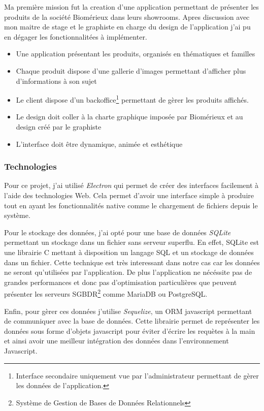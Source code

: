 \documentclass{article}
\begin{document}
Ma première mission fut la creation d'une application permettant de présenter les produits de la société Biomérieux dans leurs showrooms.
Apres discussion avec mon maitre de stage et le graphiste en charge du design de l'application j'ai pu en dégager les fonctionnalitées à implémenter.

\medskip

\begin{itemize}
    \item Une application présentant les produits, organisés en thématiques et familles
    \item Chaque produit dispose d'une gallerie d'images permettant d'afficher plus d'informations à son sujet
    \item Le client dispose d'un backoffice\footnote{Interface secondaire uniquement vue par l'administrateur permettant de gèrer les données de l'application.} permettant de gèrer les produits affichés.
    \item Le design doit coller à la charte graphique imposée par Biomérieux et au design créé par le graphiste
    \item L'interface doit être dynamique, animée et esthétique
\end{itemize}

\subsubsection{Technologies}

Pour ce projet, j'ai utilisé \emph{Electron} qui permet de créer des interfaces facilement à l'aide des technologies Web.
Cela permet d'avoir une interface simple à produire tout en ayant les fonctionnalités native comme le chargement de fichiers depuis le système.

Pour le stockage des données, j'ai opté pour une base de données \emph{SQLite} permettant un stockage dans un fichier sans serveur superflu.
En effet, SQLite est une librairie C mettant à disposition un langage SQL et un stockage de données dans un fichier.
Cette technique est très interessant dans notre cas car les données ne seront qu'utilisées par l'application.
De plus l'application ne nécéssite pas de grandes performances et donc pas d'optimisation particulières que peuvent présenter les serveurs SGBDR\footnote{Système de Gestion de Bases de Données Relationnels} comme MariaDB ou PostgreSQL\@.

Enfin, pour gèrer ces données j'utilise \emph{Sequelize}, un ORM javascript permettant de communiquer avec la base de données.
Cette librairie permet de représenter les données sous forme d'objets javascript pour éviter d'écrire les requètes à la main et ainsi avoir une meilleur intégration des données dans l'environnement Javascript.
\end{document}
